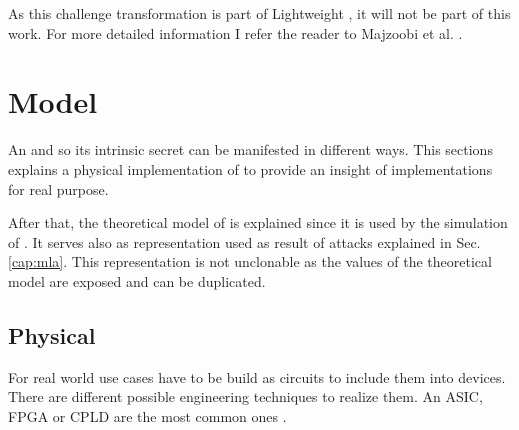 As this challenge transformation is part of Lightweight \pufs, it will not be part of this work.
For more detailed information I refer the reader to Majzoobi et al. \cite{Majzoobi2008LightweightPUFs} .


\section{Model}
\label{sec:model}

An \apuf and so its intrinsic secret can be manifested in different ways.
This sections explains a physical implementation of \apufs to provide an insight of \apuf implementations for real purpose. %

After that, the theoretical model of \apufs is explained since it is used by the simulation of \apufs.
It serves also as representation used as result of attacks explained in Sec. \ref{cap:mla}.
This representation is not unclonable as the values of the theoretical model are exposed and can be duplicated.


\subsection{Physical}
\label{sec:physical}

For real world use cases \apufs have to be build as circuits to include them into devices.
There are different possible engineering techniques to realize them.
An \ac{ASIC}, \ac{FPGA} or \ac{CPLD} are the most common ones \cite{Maes2012ExperimentalCMOS, Majzoobi2010FPGALines, Soybali2011ImplementationFPGA, Tajik2014PhysicalPUFs}.


